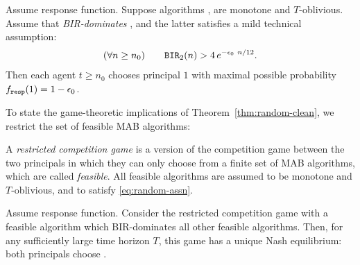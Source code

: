 \begin{theorem}\label{thm:random-clean}
Assume \HardMaxRandom response function. Suppose algorithms \alg[1], \alg[2] are monotone and $T$-oblivious. Assume that \alg[1] \emph{BIR-dominates} \alg[2], and the latter satisfies a mild technical assumption:
\begin{align}\label{eq:random-assn}
 (\forall n\geq n_0) \qquad
  \mathtt{BIR}_2(n) > 4\,e^{-\epsilon_0\ n/12}.
\end{align}
Then each agent $t\geq n_0$ chooses principal $1$ with maximal possible probability $f_{\mathtt{resp}}(1) = 1- \epsilon_0$.
\end{theorem}







To state the game-theoretic implications of Theorem~\ref{thm:random-clean}, we restrict the set of feasible MAB algorithms:

\begin{definition}\label{def:restricted-competition}
A \emph{restricted competition game} is a version of the competition game between the two principals in which they can only choose from a finite set of MAB algorithms, which are called \emph{feasible}. All feasible algorithms are assumed to be
monotone and $T$-oblivious, and to satisfy \eqref{eq:random-assn}.
\end{definition}

\begin{corollary}\label{cor:random}
Assume \HardMaxRandom response function. Consider the restricted competition game with a feasible algorithm \alg which BIR-dominates all other feasible algorithms. Then, for any sufficiently large time horizon $T$, this game has a unique Nash equilibrium: both principals choose \alg.
\end{corollary}



